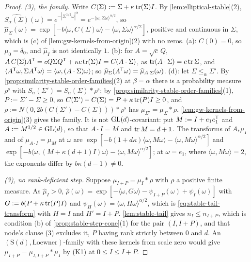 \begin{proof}
\emph{(3), the family.} Write $C(\Sigma) := \Sigma + \kappa\operatorname{tr}(\Sigma)I$. By \ref{lem:elliptical-stable}(2),
$\widehat{S_\alpha(\Sigma)}(\omega) = e^{-|\Sigma^{1/2}\omega|^\alpha} = e^{-\langle\omega,\Sigma\omega\rangle^{\alpha/2}}$,
so $\widehat\mu_\Sigma(\omega) = \exp[-b\langle\omega,C(\Sigma)\omega\rangle - \langle\omega,\Sigma\omega\rangle^{\alpha/2}]$,
positive and continuous in $\Sigma$, which is (c) of \ref{lem:gw-kernels-from-origin}(2) with no zeros. (a):
$C(0) = 0$, so $\mu_0 = \delta_0$, and $\widehat\mu_I$ is not identically $1$. (b): for $A = \sqrt c\,Q$,
$A\,C(\Sigma)A^{\mathsf{T}} = cQ\Sigma Q^{\mathsf{T}} + \kappa c\operatorname{tr}(\Sigma)I = C(A\cdot\Sigma)$, as $\operatorname{tr}(A\cdot\Sigma) = c\operatorname{tr}\Sigma$,
and $\langle A^{\mathsf{T}}\omega,\Sigma A^{\mathsf{T}}\omega\rangle = \langle\omega,(A\cdot\Sigma)\omega\rangle$; so
$\widehat\mu_\Sigma(A^{\mathsf{T}}\omega) = \widehat\mu_{A\cdot\Sigma}(\omega)$. (d): let $\Sigma \le_\alpha \Sigma'$. By \ref{prop:similarity-stable-order-families}(2) at $\beta = \alpha$ there is a probability measure $\rho^{\mathrm s}$ with $S_\alpha(\Sigma') = S_\alpha(\Sigma) *
\rho^{\mathrm s}$; by \ref{prop:similarity-stable-order-families}(1), $P :=  \Sigma' - \Sigma \ge 0$, so $C(\Sigma') - C(\Sigma) = P + \kappa\operatorname{tr}(P)I \ge 0$, and
$\rho := N(0, 2b(C(\Sigma') - C(\Sigma))) * \rho^{\mathrm s}$ has $\mu_{\Sigma'} = \mu_\Sigma * \rho$.
\ref{lem:gw-kernels-from-origin}(3) gives the family. It is not $\mathrm{GL}(d)$-covariant: put
$M := I + e_1e_1^{\mathsf{T}}$ and $A := M^{1/2} \in \mathrm{GL}(d)$, so that $A\cdot I = M$ and $\operatorname{tr} M = d + 1$. The
transforms of $A_*\mu_I$ and of $\mu_{A\cdot I} = \mu_M$ at $\omega$ are
$\exp[-b(1 + d\kappa)\langle\omega,M\omega\rangle - \langle\omega,M\omega\rangle^{\alpha/2}]$ and
$\exp[-b\langle\omega,(M + \kappa(d+1)I)\omega\rangle - \langle\omega,M\omega\rangle^{\alpha/2}]$; at $\omega = e_1$,
where $\langle\omega,M\omega\rangle = 2$, the exponents differ by $b\kappa(d - 1) \ne 0$.

\emph{(3), no rank-deficient step.} Suppose $\mu_{I+P} = \mu_I * \rho$ with $\rho$ a positive finite measure.
As $\widehat\mu_I > 0$, $\widehat\rho(\omega) = \exp[-\langle\omega,G\omega\rangle - \psi_{I+P}(\omega) + \psi_I(\omega)]$ with
$G := b(P + \kappa\operatorname{tr}(P)I)$ and $\psi_H(\omega) = \langle\omega,H\omega\rangle^{\alpha/2}$, which is
\ref{eq:stable-tail-transform} with $H = I$ and $H' = I + P$. \ref{lem:stable-tail} gives $n_I \le n_{I+P}$,
which is condition (b) of \ref{prop:stable-step-cone}(1) for the pair $(I, I + P)$, and that node's clause (3)
excludes it, $P$ having rank strictly between $0$ and $d$. An $(\mathrm S(d), \text{Loewner})$-family with these
kernels from scale zero would give $\mu_{I+P} = \mu_{I,I+P} * \mu_I$ by (K1) at $0 \le I \le I + P$.
\end{proof}

